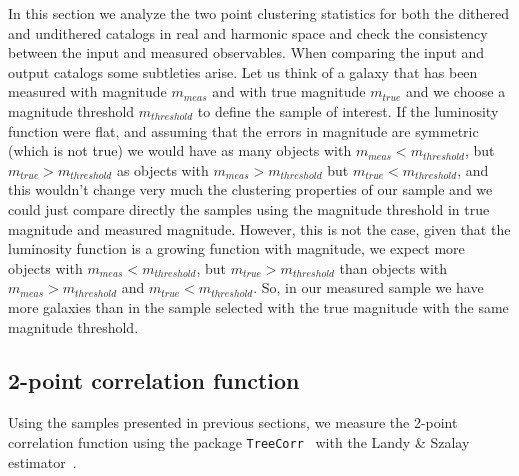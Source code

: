 \documentclass[\docopts]{\docclass}
\begin{document}
In this section we analyze the two point clustering statistics for both the dithered and undithered catalogs in real and harmonic space and check the consistency between the input and measured observables. When comparing the input and output catalogs some subtleties arise. Let us think of a galaxy that has been measured with magnitude $m_{meas}$ and with true magnitude $m_{true}$ and we choose a magnitude threshold $m_{threshold}$ to define the sample of interest. If the luminosity function were flat, and assuming that the errors in magnitude are symmetric (which is not true) we would have as many objects with $m_{meas}<m_{threshold}$, but $m_{true}>m_{threshold}$ as objects with $m_{meas}>m_{threshold}$ but $m_{true}<m_{threshold}$, and this wouldn't change very much the clustering properties of our sample and we could just compare directly the samples using the magnitude threshold in true magnitude and measured magnitude. However, this is not the case, given that the luminosity function is a growing function with magnitude, we expect more objects with $m_{meas}<m_{threshold}$, but $m_{true}>m_{threshold}$ than objects with $m_{meas}>m_{threshold}$ and $m_{true}<m_{threshold}$. So, in our measured sample we have more galaxies than in the sample selected with the true magnitude with the same magnitude threshold.
\subsection{2-point correlation function}
Using the samples presented in previous sections, we measure the 2-point correlation function using the package \texttt{TreeCorr}~\citep{2004MNRAS.352..338J} with the Landy \& Szalay estimator~\citep{1993ApJ...412...64L}.
\end{document}
